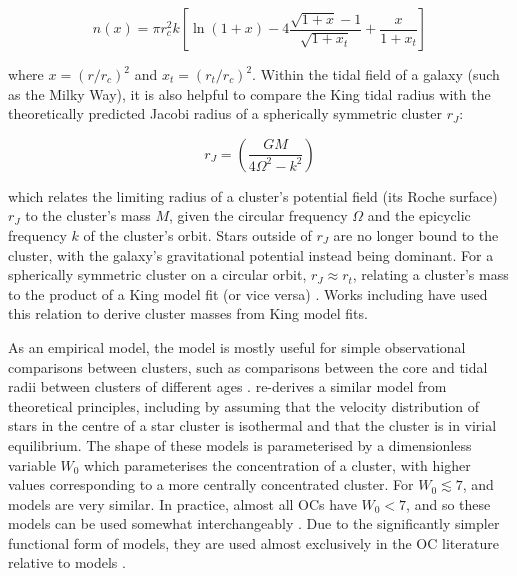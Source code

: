 \begin{equation}
	n(x) = \pi r_c^2 k \left[ \ln(1+x) - 4 \frac{\sqrt{1+x} - 1}{\sqrt{1 + x_t}} + \frac{x}{1 + x_t} \right]
\end{equation}

\noindent
where $x = (r / r_c)^2$ and $x_t = (r_t / r_c)^2$. Within the tidal field of a galaxy (such as the Milky Way), it is also helpful to compare the King tidal radius with the theoretically predicted Jacobi radius of a spherically symmetric cluster $r_J$:

\begin{equation}
	r_J = \left( \frac{GM}{4\Omega^2 - k^2} \right)
	\label{eqn:intro:jacobi_radius}
\end{equation}

\noindent %
which relates the limiting radius of a cluster's potential field (its Roche surface) $r_J$ to the cluster's mass $M$, given the circular frequency $\Omega$ and the epicyclic frequency $k$ of the cluster's orbit. Stars outside of $r_J$ are no longer bound to the cluster, with the galaxy's gravitational potential instead being dominant. For a spherically symmetric cluster on a circular orbit, $r_J \approx r_t$, relating a cluster's mass to the product of a King model fit (or vice versa) . Works including  have used this relation to derive cluster masses from King model fits.

As an empirical model, the \cite{king_structure_star_1962} model is mostly useful for simple observational comparisons between clusters, such as comparisons between the core and tidal radii between clusters of different ages \citep{kharchenko_global_2013,tarricq_structural_2022}. \cite{king_structure_1966} re-derives a similar model from theoretical principles, including by assuming that the velocity distribution of stars in the centre of a star cluster is isothermal and that the cluster is in virial equilibrium. The shape of these models is parameterised by a dimensionless variable $W_0$ which parameterises the concentration of a cluster, with higher values corresponding to a more centrally concentrated cluster. For $W_0 \lesssim 7$, \cite{king_structure_star_1962} and \cite{king_structure_1966} models are very similar. In practice, almost all OCs have $W_0 < 7$, and so these models can be used somewhat interchangeably \citep{portegies_zwart_young_2010}. Due to the significantly simpler functional form of \cite{king_structure_star_1962} models, they are used almost exclusively in the OC literature relative to \cite{king_structure_1966} models \citep{portegies_zwart_young_2010,cantat-gaudin_milky_2022}.


